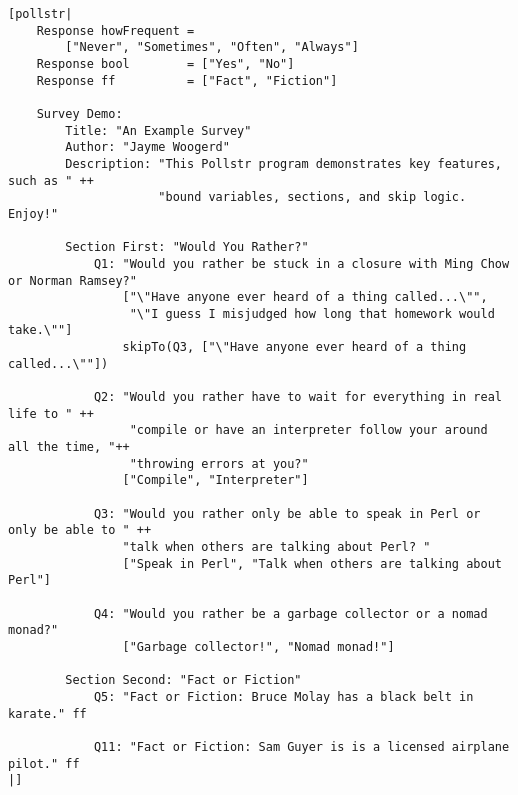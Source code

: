 \documentclass[pldi]{sigplanconf-pldi15}
\begin{document}
\begin{lstlisting}
[pollstr|
    Response howFrequent = 
        ["Never", "Sometimes", "Often", "Always"]
    Response bool        = ["Yes", "No"]
    Response ff          = ["Fact", "Fiction"]

    Survey Demo:
        Title: "An Example Survey"
        Author: "Jayme Woogerd"
        Description: "This Pollstr program demonstrates key features, such as " ++
                     "bound variables, sections, and skip logic. Enjoy!"

        Section First: "Would You Rather?"
            Q1: "Would you rather be stuck in a closure with Ming Chow or Norman Ramsey?"
                ["\"Have anyone ever heard of a thing called...\"",
                 "\"I guess I misjudged how long that homework would take.\""]
                skipTo(Q3, ["\"Have anyone ever heard of a thing called...\""])

            Q2: "Would you rather have to wait for everything in real life to " ++
                 "compile or have an interpreter follow your around all the time, "++
                 "throwing errors at you?"
                ["Compile", "Interpreter"]

            Q3: "Would you rather only be able to speak in Perl or only be able to " ++
                "talk when others are talking about Perl? "
                ["Speak in Perl", "Talk when others are talking about Perl"]

            Q4: "Would you rather be a garbage collector or a nomad monad?"
                ["Garbage collector!", "Nomad monad!"]

        Section Second: "Fact or Fiction"
            Q5: "Fact or Fiction: Bruce Molay has a black belt in karate." ff

            Q11: "Fact or Fiction: Sam Guyer is is a licensed airplane pilot." ff
|]
\end{lstlisting}

%


\end{document}
